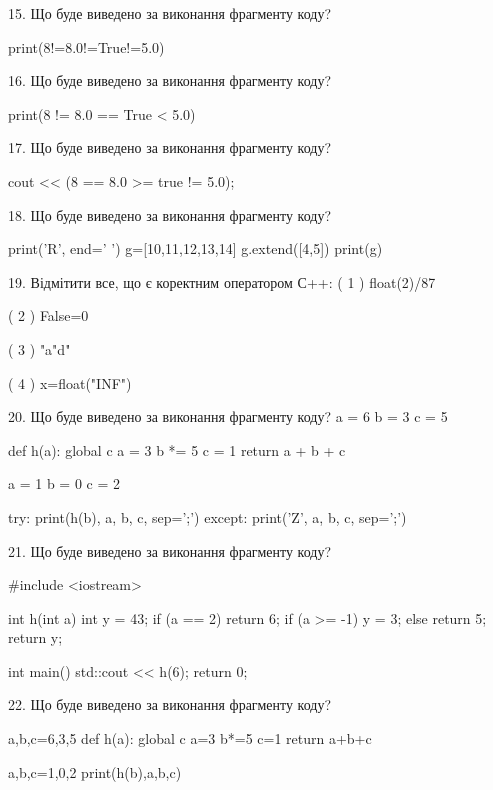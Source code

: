 \documentclass[11pt]{article}
\begin{document}
15. Що буде виведено за виконання фрагменту коду?

print(8!=8.0!=True!=5.0)


16. Що буде виведено за виконання фрагменту коду?

print(8 != 8.0 == True < 5.0)


17. Що буде виведено за виконання фрагменту коду?

cout << (8 == 8.0 >= true != 5.0);


18. Що буде виведено за виконання фрагменту коду?

print('R', end=' ')
g=[10,11,12,13,14]
g.extend([4,5])
print(g)



19. %
Відмітити все, що є коректним оператором С++:
( 1 ) float(2)/87

( 2 ) False=0

( 3 ) "a"d"

( 4 ) x=float("INF")


20. Що буде виведено за виконання фрагменту коду?
a = 6
b = 3
c = 5

def h(a):
global c    a = 3
    b *= 5
    c = 1
    return a + b + c

a = 1
b = 0
c = 2

try:
    print(h(b), a, b, c, sep=';')
except:
    print('Z', a, b, c, sep=';')


21. Що буде виведено за виконання фрагменту коду?

#include <iostream>

int h(int a){
    int y = 43;
    if (a == 2) 
        return 6;
    if (a >= -1)
         y = 3;
    else
         return 5;
    return y;
}

int main(){
    std::cout << h(6);
    return 0;
}



22. Що буде виведено за виконання фрагменту коду?

a,b,c=6,3,5
def h(a):
global c    a=3
    b*=5
    c=1
    return a+b+c

a,b,c=1,0,2
print(h(b),a,b,c)
\end{document}
